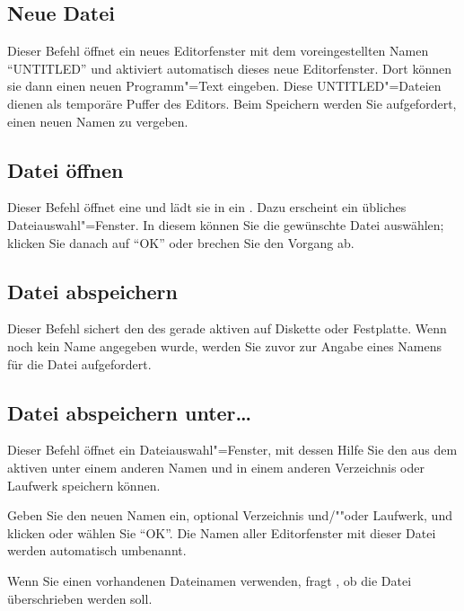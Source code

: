 \subsection{Neue Datei}\label{sec:MI_NEW}
Dieser Befehl öffnet ein neues Editorfenster mit dem voreingestellten
Namen "`UNTITLED"' und aktiviert automatisch dieses neue Editorfenster.
Dort können sie dann einen neuen Programm"=Text eingeben. Diese
UNTITLED"=Dateien dienen als temporäre Puffer des Editors.  Beim
Speichern werden Sie aufgefordert, einen neuen Namen zu vergeben.


\subsection{Datei öffnen}
\label{sec:MI_OPEN}

Dieser Befehl öffnet eine 
und lädt sie in ein . Dazu
erscheint ein übliches Dateiauswahl"=Fenster. In diesem können Sie die
gewünschte Datei auswählen; klicken Sie danach auf "`OK"' oder brechen Sie
den Vorgang ab.



\subsection{Datei abspeichern}\label{sec:MI_SAVE}
Dieser Befehl sichert den  des gerade 
aktiven  auf Diskette oder Festplatte. 
Wenn noch kein Name angegeben wurde, werden Sie zuvor zur Angabe 
eines Namens für die Datei aufgefordert.



\subsection{Datei abspeichern 
unter\dots{}}\label{sec:MI_SAVEAS}

Dieser Befehl öffnet ein Dateiauswahl"=Fenster, mit dessen Hilfe Sie
den  aus dem aktiven
 unter einem anderen Namen und
in einem anderen Verzeichnis oder Laufwerk speichern können.


Geben Sie den neuen Namen ein, optional Verzeichnis und/""oder Laufwerk,
und klicken oder wählen Sie "`OK"'. Die Namen aller Editorfenster mit
dieser Datei werden automatisch umbenannt.


Wenn Sie einen vorhandenen Dateinamen verwenden, fragt \mutabor{}, ob
die Datei überschrieben werden soll.


